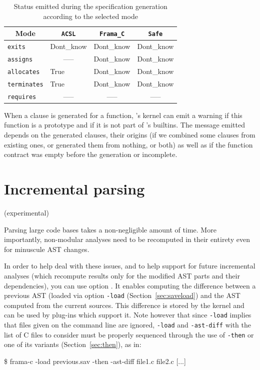 \begin{table}[t]
  \centering
  \begin{tabular}{@{}l|l|l|l@{}}
      \multicolumn{1}{c|}{Mode} &
      \multicolumn{1}{c|}{\texttt{ACSL}} &
      \multicolumn{1}{c|}{\texttt{Frama\_C}} &
      \multicolumn{1}{c}{\texttt{Safe}} \\ \midrule

      \texttt{exits}      & Dont\_know                 & Dont\_know & Dont\_know \\
      \texttt{assigns}    & \multicolumn{1}{c|}{-----} & Dont\_know & Dont\_know \\
      \texttt{allocates}  & True                       & Dont\_know & Dont\_know \\
      \texttt{terminates} & True                       & Dont\_know & Dont\_know \\
      \texttt{requires}   & \multicolumn{1}{c|}{-----} & \multicolumn{1}{c|}{-----} & \multicolumn{1}{c}{-----} \\
  \end{tabular}
  \caption{Status emitted during the specification generation according to the selected mode}
  \label{table:populate-status}
\end{table}

When a clause is generated for a function, \FramaC's kernel can emit a warning
if this function is a prototype and if it is not part of \FramaC's builtins. The
message emitted depends on the generated clauses, their origins (if we combined
some clauses from existing ones, or generated them from nothing, or both) as
well as if the function contract was empty before the generation or incomplete.

\section{Incremental parsing} (experimental)\label{sec:incremental-parsing}

Parsing large code bases takes a non-negligible amount of time.
More importantly, non-modular analyses need to be recomputed in their entirety
even for minuscule AST changes.

In order to help deal with these issues, and to help support for future
incremental analyses (which recompute results only for the modified AST parts
and their dependencies), you can use option .
It enables computing the difference between a previous AST (loaded via
option \verb|-load| (Section~\ref{sec:saveload}) and the AST computed from the
current sources. This difference is stored by the \FramaC kernel and can be
used by plug-ins which support it. Note however that since \verb|-load| implies that
files given on the command line are ignored, \verb|-load| and \verb|-ast-diff| with
the list of C files to consider must be properly sequenced through the use of
\verb|-then| or one of its variants (Section~\ref{sec:then}), as in:
\begin{frama-c-commands}
\$ frama-c -load previous.sav -then -ast-diff file1.c file2.c [...]
\end{frama-c-commands}

